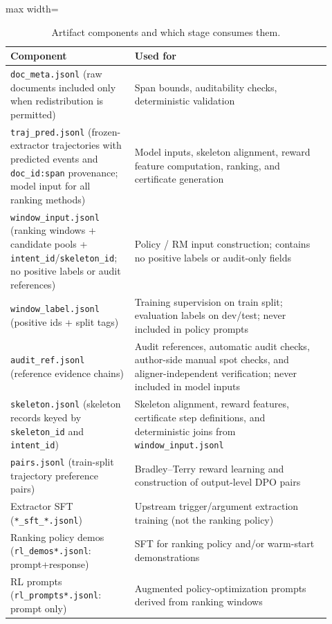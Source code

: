 \documentclass{article}
\begin{document}
\begin{table}[ht]
\centering
\caption{Artifact components and which stage consumes them.}
\label{tab:artifact_components}
\small
\setlength{\tabcolsep}{4pt}
\begin{adjustbox}{max width=\linewidth}
\begin{tabular}{p{0.34\linewidth}p{0.58\linewidth}}
\hline
Component & Used for \\
\hline
\texttt{doc\_meta.jsonl} (raw documents included only when redistribution is permitted) & Span bounds, auditability checks, deterministic validation \\
\texttt{traj\_pred.jsonl} (frozen-extractor trajectories with predicted events and \texttt{doc\_id:span} provenance; model input for all ranking methods) 
& Model inputs, skeleton alignment, reward feature computation, ranking, and certificate generation \\
\texttt{window\_input.jsonl} (ranking windows + candidate pools + \texttt{intent\_id}/\texttt{skeleton\_id}; no positive labels or audit references) 
& Policy / RM input construction; contains no positive labels or audit-only fields \\
\texttt{window\_label.jsonl} (positive ids + split tags) 
& Training supervision on train split; evaluation labels on dev/test; never included in policy prompts \\
\texttt{audit\_ref.jsonl} (reference evidence chains) 
& Audit references, automatic audit checks, author-side manual spot checks, and aligner-independent verification; never included in model inputs \\
\texttt{skeleton.jsonl} (skeleton records keyed by \texttt{skeleton\_id} and \texttt{intent\_id}) 
& Skeleton alignment, reward features, certificate step definitions, and deterministic joins from \texttt{window\_input.jsonl} \\
\texttt{pairs.jsonl} (train-split trajectory preference pairs) 
& Bradley--Terry reward learning and construction of output-level DPO pairs \\
Extractor SFT (\texttt{*\_sft\_*.jsonl}) & Upstream trigger/argument extraction training (not the ranking policy) \\
Ranking policy demos (\texttt{rl\_demos*.jsonl}: prompt+response) & SFT for ranking policy and/or warm-start demonstrations \\
RL prompts (\texttt{rl\_prompts*.jsonl}: prompt only) & Augmented policy-optimization prompts derived from ranking windows \\
\hline
\end{tabular}
\end{adjustbox}
\end{table}
\end{document}
